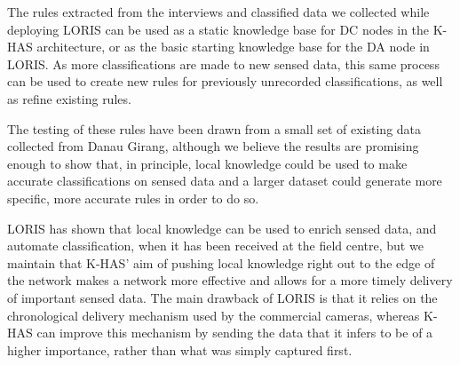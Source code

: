         The rules extracted from the interviews and classified data we collected while deploying LORIS can be used as a static knowledge base for DC nodes in the K-HAS architecture, or as the basic starting knowledge base for the DA node in LORIS. As more classifications are made to new sensed data, this same process can be used to create new rules for previously unrecorded classifications, as well as refine existing rules. 

    The testing of these rules have been drawn from a small set of existing data collected from Danau Girang, although we believe the results are promising enough to show that, in principle, local knowledge could be used to make accurate classifications on sensed data and a larger dataset could generate more specific, more accurate rules in order to do so.
	
	LORIS has shown that local knowledge can be used to enrich sensed data, and automate classification, when it has been received at the field centre, but we  maintain that K-HAS' aim of pushing local knowledge right out to the edge of the network makes a network more effective and allows for a more timely delivery of important sensed data.  The main drawback of LORIS is that it relies on the chronological delivery mechanism used by the commercial cameras, whereas K-HAS can improve this mechanism by sending the data that it infers to be of a higher importance, rather than what was simply captured first.
